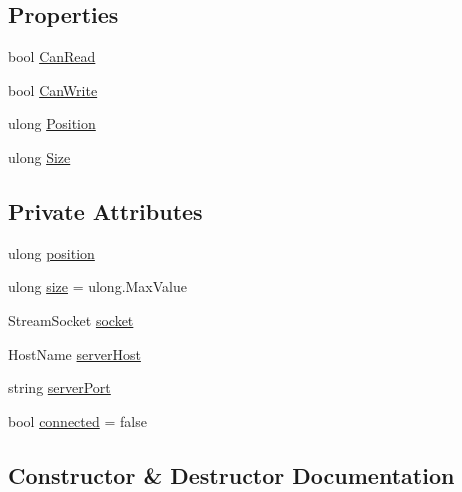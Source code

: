 \subsection*{Properties}
\begin{DoxyCompactItemize}
\item 
bool \hyperlink{class_e_l_i_client_1_1_input_video_stream_a2d698a07eac376481d0ed20dfb664c0a}{Can\+Read}
\item 
bool \hyperlink{class_e_l_i_client_1_1_input_video_stream_aaa9a5b3b5591f4faa479ca63b702ef54}{Can\+Write}
\item 
ulong \hyperlink{class_e_l_i_client_1_1_input_video_stream_ad7aa08dea5beb6c2cdd356f6b8f2afbc}{Position}
\item 
ulong \hyperlink{class_e_l_i_client_1_1_input_video_stream_a720f0a6225a45adda7e48fe6e388c645}{Size}
\end{DoxyCompactItemize}
\subsection*{Private Attributes}
\begin{DoxyCompactItemize}
\item 
ulong \hyperlink{class_e_l_i_client_1_1_input_video_stream_afa8afb29384563f3abc625defc4847a4}{position}
\item 
ulong \hyperlink{class_e_l_i_client_1_1_input_video_stream_afd80ab457d638f2d783dc8c403566290}{size} = ulong.\+Max\+Value
\item 
Stream\+Socket \hyperlink{class_e_l_i_client_1_1_input_video_stream_ad4a616700059844fb7035fc366e0abc5}{socket}
\item 
Host\+Name \hyperlink{class_e_l_i_client_1_1_input_video_stream_ae3dd99393a07776d217543c63d745880}{server\+Host}
\item 
string \hyperlink{class_e_l_i_client_1_1_input_video_stream_aa8980ab6e2baf1ca3035472d7e7fb10a}{server\+Port}
\item 
bool \hyperlink{class_e_l_i_client_1_1_input_video_stream_a4b9b5dfb4effc20c16c1b8713fb6b2d2}{connected} = false
\end{DoxyCompactItemize}


\subsection{Constructor \& Destructor Documentation}
\mbox{\label{class_e_l_i_client_1_1_input_video_stream_aeb09c4dec65a8619e609b66dc27e7b0c}} 
